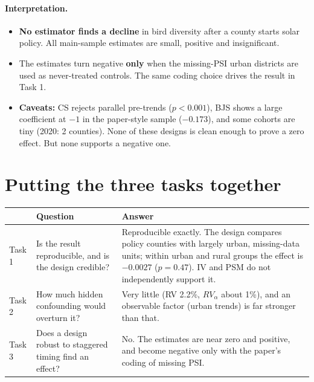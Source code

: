 \documentclass[11pt]{article}
\begin{document}
\paragraph{Interpretation.}
\begin{itemize}
\item \textbf{No estimator finds a decline} in bird diversity after a county starts solar policy. All main-sample estimates are small, positive and insignificant.
\item The estimates turn negative \textbf{only} when the missing-PSI urban districts are used as never-treated controls. The same coding choice drives the result in Task 1.
\item \textbf{Caveats:} CS rejects parallel pre-trends ($p<0.001$), BJS shows a large coefficient at $-1$ in the paper-style sample ($-0.173$), and some cohorts are tiny (2020: 2 counties). None of these designs is clean enough to prove a zero effect. But none supports a negative one.
\end{itemize}

\section{Putting the three tasks together}

\begin{table}[H]\centering\small
\begin{tabularx}{\linewidth}{l>{\raggedright\arraybackslash}X>{\raggedright\arraybackslash}X}
\toprule
& \textbf{Question} & \textbf{Answer}\\
\midrule
Task 1 & Is the result reproducible, and is the design credible? & Reproducible exactly. The design compares policy counties with largely urban, missing-data units; within urban and rural groups the effect is $-0.0027$ ($p=0.47$). IV and PSM do not independently support it.\\
Task 2 & How much hidden confounding would overturn it? & Very little (RV 2.2\%, $RV_\alpha$ about 1\%), and an observable factor (urban trends) is far stronger than that.\\
Task 3 & Does a design robust to staggered timing find an effect? & No. The estimates are near zero and positive, and become negative only with the paper's coding of missing PSI.\\
\bottomrule
\end{tabularx}
\end{table}
\end{document}
